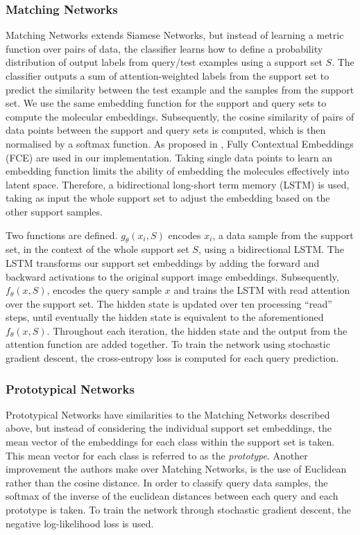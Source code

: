 \subsubsection{Matching Networks}

Matching Networks extends Siamese Networks, but instead of learning a metric function over pairs of data, the classifier learns how to define a probability distribution of output labels from query/test examples using a support set $S$. The classifier outputs a sum of attention-weighted labels from the support set to predict the similarity between the test example and the samples from the support set. We use the same embedding function for the support and query sets to compute the molecular embeddings. Subsequently, the cosine similarity of pairs of data points between the support and query sets is computed, which is then normalised by a softmax function. As proposed in \citet{vinyals2016matching}, Fully Contextual Embeddings (FCE) are used in our implementation. Taking single data points to learn an embedding function limits the ability of embedding the molecules effectively into latent space. Therefore, a bidirectional long-short term memory (LSTM) is used, taking as input the whole support set to adjust the embedding based on the other support samples.

Two functions are defined. $g_\theta(x_i, S)$ encodes $x_i$, a data sample from the support set, in the context of the whole support set $S$, using a bidirectional LSTM. The LSTM transforms our support set embeddings by adding the forward and backward activations to the original support image embeddings. Subsequently, $f_\theta(x, S)$, encodes the query sample $x$ and trains the LSTM with read attention over the support set. The hidden state is updated over ten processing ``read'' steps, until eventually the hidden state is equivalent to the aforementioned $f_\theta(x, S)$. Throughout each iteration, the hidden state and the output from the attention function are added together. To train the network using stochastic gradient descent, the cross-entropy loss is computed for each query prediction.

\subsubsection{Prototypical Networks}

Prototypical Networks \citep{snell2017prototypical} have similarities to the Matching Networks described above, but instead of considering the individual support set embeddings, the mean vector of the embeddings for each class within the support set is taken. This mean vector for each class is referred to as the \textit{prototype}. Another improvement the authors make over Matching Networks, is the use of Euclidean rather than the cosine distance. In order to classify query data samples, the softmax of the inverse of the euclidean distances between each query and each prototype is taken. To train the network through stochastic gradient descent, the negative log-likelihood loss is used. 

